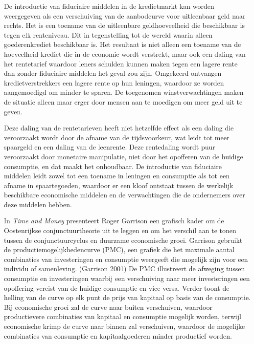 \documentclass[
  a5paper,
  smalldemyvopaper,11pt,twoside,onecolumn,openright,extrafontsizes,
hidelinks]{memoir}
\begin{document}
De introductie van fiduciaire middelen in de kredietmarkt kan worden
weergegeven als een verschuiving van de aanbodcurve voor uitleenbaar
geld naar rechts. Het is een toename van de uitleenbare geldhoeveelheid
die beschikbaar is tegen elk renteniveau. Dit in tegenstelling tot de
wereld waarin alleen goederenkrediet beschikbaar is. Het resultaat is
niet alleen een toename van de hoeveelheid krediet die in de economie
wordt verstrekt, maar ook een daling van het rentetarief waardoor leners
schulden kunnen maken tegen een lagere rente dan zonder fiduciaire
middelen het geval zou zijn. Omgekeerd ontvangen kredietverstrekkers een
lagere rente op hun leningen, waardoor ze worden aangemoedigd om minder
te sparen. De toegenomen winstverwachtingen maken de situatie alleen
maar erger door mensen aan te moedigen om meer geld uit te geven.

Deze daling van de rentetarieven heeft niet hetzelfde effect als een
daling die veroorzaakt wordt door de afname van de tijdsvoorkeur, wat
leidt tot meer spaargeld en een daling van de leenrente. Deze
rentedaling wordt puur veroorzaakt door monetaire manipulatie, niet door
het opofferen van de huidige consumptie, en dat maakt het onhoudbaar. De
introductie van fiduciaire middelen leidt zowel tot een toename in
leningen en consumptie als tot een afname in spaartegoeden, waardoor er
een kloof ontstaat tussen de werkelijk beschikbare economische middelen
en de verwachtingen die de ondernemers over deze middelen hebben.

In \emph{Time and Money} presenteert Roger Garrison een grafisch kader
om de Oostenrijkse conjunctuurtheorie uit te leggen en om het verschil
aan te tonen tussen de conjunctuurcyclus en duurzame economische groei.
Garrison gebruikt de productiemogelijkhedencurve (PMC), een grafiek die
het maximale aantal combinaties van investeringen en consumptie
weergeeft die mogelijk zijn voor een individu of samenleving. (Garrison
2001) De PMC illustreert de afweging tussen consumptie en investeringen
waarbij een verschuiving naar meer investeringen een opoffering vereist
van de huidige consumptie en vice versa. Verder toont de helling van de
curve op elk punt de prijs van kapitaal op basis van de consumptie. Bij
economische groei zal de curve naar buiten verschuiven, waardoor
productievere combinaties van kapitaal en consumptie mogelijk worden,
terwijl economische krimp de curve naar binnen zal verschuiven, waardoor
de mogelijke combinaties van consumptie en kapitaalgoederen minder
productief worden.
\end{document}
